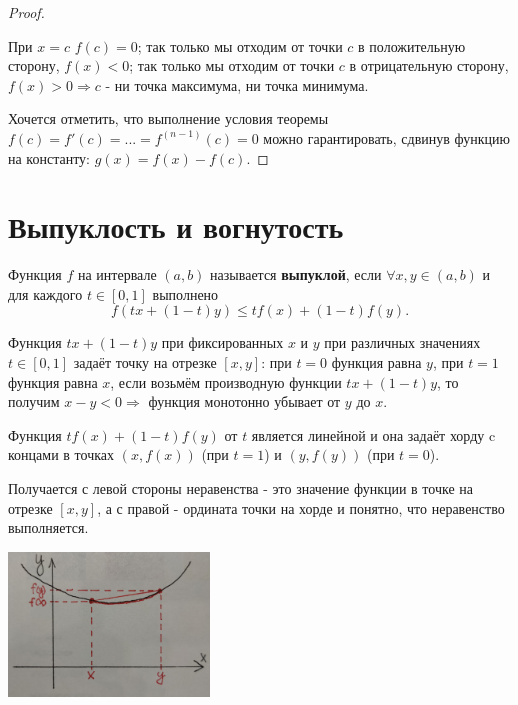 \begin{proof}
\begin{enumerate}
			При $x = c$ $f(c) = 0$; так только мы отходим от точки $c$ в положительную сторону, $f(x) < 0$; так только мы отходим от точки $c$ в отрицательную сторону, $f(x) > 0 \Rightarrow c$ - ни точка максимума, ни точка минимума.
		\end{enumerate}
		
		Хочется отметить, что выполнение условия теоремы $f(c) = f'(c) = ... = f^{(n - 1)}(c) = 0$ можно гарантировать, сдвинув функцию на константу: $g(x) = f(x) - f(c)$.
	\end{proof}
	
	\section{Выпуклость и вогнутость}
	
	\begin{definition}
		Функция $f$ на интервале $(a, b)$ называется \textbf{выпуклой}, если $\forall x, y \in (a, b)$ и для каждого $t \in [0, 1]$ выполнено
		\[ f(tx + (1 - t)y) \leqslant tf(x) + (1 - t) f(y). \]
	\end{definition}
	
	\begin{explanation}
	    Функция $tx + (1 - t)y$ при фиксированных $x$ и $y$	при различных значениях $t \in [0, 1]$ задаёт точку на отрезке $[x, y]$: при $t = 0$ функция равна $y$, при $t = 1$ функция равна $x$, если возьмём производную функции $tx + (1 - t)y$, то получим $x - y < 0 \Rightarrow$ функция монотонно убывает от $y$ до $x$.
	    
	    Функция $t f(x) + (1 - t) f(y)$ от $t$ является линейной и она задаёт хорду c концами в точках $(x, f(x))$ (при $t = 1$) и $(y, f(y))$ (при $t = 0$). 
	    
	    Получается с левой стороны неравенства - это значение функции в точке на отрезке $[x, y]$, а с правой - ордината точки на хорде и понятно, что неравенство выполняется.
	\end{explanation}
	
	\begin{center}
		\includegraphics[width=0.4\textwidth]{img/lecture21/convex}
	\end{center}
	

